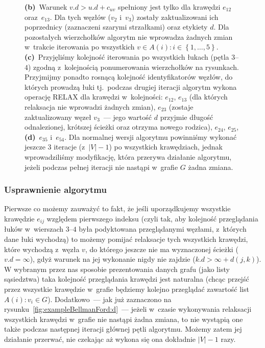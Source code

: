 \begin{figure}[!htbp]
{		\textbf{(b)}~Warunek $v.d > u.d + c_{uv}$ spełniony jest tylko dla krawędzi $e_{12}$ oraz~$e_{13}$.
		Dla tych węzłów ($v_{2}$ i~$v_{3}$) zostały zaktualizowani ich poprzednicy (zaznaczeni szarymi strzałkami) oraz etykiety $d$.
		Dla pozostałych wierzchołków algorytm nie wprowadza żadnych zmian w~trakcie iterowania po wszystkich $v \in A \left( i \right) : i \in \left\{ 1, \dots, 5\right\}$.
		\textbf{(c)}~Przyjęliśmy kolejność iterowania po wszystkich łukach (pętla $3$--$4$) zgodną z~kolejnością ponumerowania wierzchołków na rysunkach.
		Przyjmijmy ponadto rosnącą kolejność identyfikatorów węzłów, do których prowadzą łuki tj.~podczas drugiej iteracji algorytm wykona operację \textsf{RELAX} dla krawędzi w~kolejności: $e_{12}$, $e_{13}$ (dla których relaksacja nie wprowadzi żadnych zmian), $e_{23}$ (zostaje zaktualizowany węzeł $v_{3}$~--- jego wartość $d$ przyjmie długość odnalezionej, krótszej ścieżki oraz otrzyma nowego rodzica), $e_{24}$, $e_{25}$,
		\textbf{(d)}~$e_{35}$ i~$e_{54}$.
		Dla normalnej wersji algorytmu powinniśmy wykonać jeszcze 3 iteracje (z~$\left| V \right| - 1$) po wszystkich krawędziach, jednak wprowadziliśmy modyfikację, która przerywa działanie algorytmu, jeżeli podczas pełnej iteracji nie nastąpi w~grafie $G$ żadna zmiana.
	}
	\label{fig:exampleBellmanFord}
\end{figure}


\subsubsection{Usprawnienie algorytmu}
\label{sub:bellmanFordEnchancements}


Pierwsze co możemy zauważyć to fakt, że jeśli uporządkujemy wszystkie krawędzie $e_{ij}$ względem pierwszego indeksu (czyli tak, aby kolejność przeglądania łuków w~wierszach $3$--$4$ była podyktowana przeglądanymi węzłami, z~których dane łuki wychodzą) to możemy pomijać relaksacje tych wszystkich krawędzi, które wychodzą z~węzła $v$, do którego jeszcze nie ma wyznaczonej ścieżki ($v.d = \infty$), gdyż warunek na jej wykonanie nigdy nie zajdzie ($ k.d > \infty + d \left( j, k \right)$).
W wybranym przez nas sposobie prezentowania danych grafu (jako listy sąsiedztwa) taka kolejność przeglądania krawędzi jest naturalna (chcąc przejść przez wszystkie krawędzie w~grafie będziemy kolejno przeglądać zawartość list$ A \left( i \right) : v_{i} \in G$).
Dodatkowo~--- jak już zaznaczono na rysunku~\ref{fig:exampleBellmanFord:d}~--- jeżeli w~czasie wykonywania relaksacji wszystkich krawędzi w~grafie nie nastąpi żadna zmiana, to nie wystąpią one także podczas następnej iteracji głównej pętli algorytmu.
Możemy zatem jej działanie przerwać, nie czekając aż wykona się ona dokładnie $\left| V \right| - 1$ razy.


